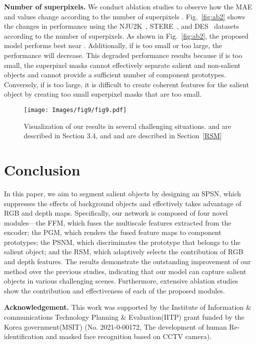 \documentclass[runningheads]{llncs}
\begin{document}
	\noindent
	\textbf{Number of superpixels.} We conduct ablation studies to observe how the MAE and  values change according to the number of superpixels . Fig.~\ref{fig:ab2} shows the changes in performance using the NJU2K~\cite{ju2014depth}, STERE~\cite{niu2012leveraging}, and DES~\cite{cheng2014depth} datasets according to the number of superpixels. As shown in Fig.~\ref{fig:ab2}, the proposed model performs best near . Additionally, if  is too small or too large, the performance will decrease. This degraded performance results because if  is too small, the superpixel masks cannot effectively separate salient and non-salient objects and cannot provide a sufficient number of component prototypes. Conversely, if  is too large, it is difficult to create coherent features for the salient object by creating too small superpixel masks that are too small.
	
	\begin{figure}[t]
		\texttt{[image: Images/fig9/fig9.pdf]}
		\caption{Visualization of our results in several challenging situations.  and  are described in Section 3.4, and  and  are described in Section~\ref{RSM}}
		\label{fig9}
	\end{figure} 
	
	\section{Conclusion}
	In this paper, we aim to segment salient objects by designing an SPSN, which suppresses the effects of background objects and effectively takes advantage of RGB and depth maps. Specifically, our network is composed of four novel modules—the FFM, which fuses the multiscale features extracted from the encoder; the PGM, which renders the fused feature maps to component prototypes; the PSNM, which discriminates the prototype that belongs to the salient object; and the RSM, which adaptively selects the contribution of RGB and depth features. The results demonstrate the outstanding improvement of our method over the previous studies, indicating that our model can capture salient objects in various challenging scenes. Furthermore, extensive ablation studies show the contribution and effectiveness of each of the proposed modules.
	
	\vfill
	\noindent\footnotesize\textbf{Acknowledgement.} This work was supported by the Institute of Information \& communications Technology Planning \& Evaluation(IITP) grant funded by the Korea government(MSIT) (No. 2021-0-00172, The development of human Re-identification and masked face recognition based on CCTV camera).
	\pagebreak
	
	\clearpage
\normalsize
	
	
\end{document}
